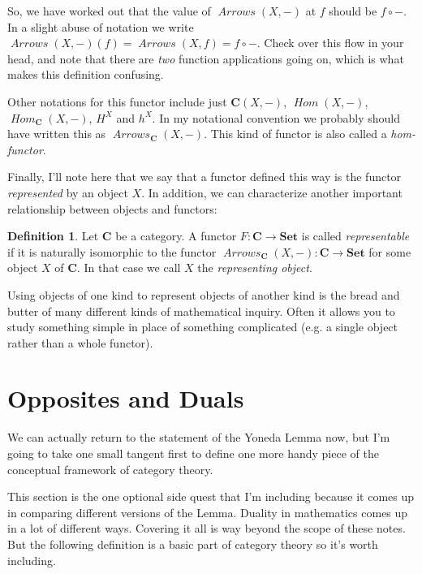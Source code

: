 \documentclass[12pt]{article}
\theoremstyle{definition}
\theoremstyle{definition}
\newtheorem{defn}{Definition}[]
\theoremstyle{definition}
\numberwithin{equation}{section}
\newcommand{\cat}[1]{\mathbf{#1}}      %
\newcommand{\fcat}[1]{{\mathbf {#1}}}    %
\newcommand{\CC}{\cat{C}}
\DeclareMathOperator{\Arrows}{\mathit{Arrows}}
\DeclareMathOperator{\Hom}{\mathit{Hom}}
\newcommand{\Set}{\fcat{Set}}           %
\def\ni{\goodbreak\noindent}
\begin{document}
So, we have worked out that the value of $\Arrows(X,-)$ at $f$ should be $f \circ -$.
In a slight abuse of notation we write
$\Arrows(X,-)(f) = \Arrows(X,f) = f \circ -$. 
Check over this flow in your head, and note that 
there are {\it two} function applications going on, which is what makes this definition 
confusing.

Other notations for this functor include just $\CC(X,-)$, $\Hom(X, -)$, $\Hom_\CC(X,
-)$, $H^X$ and $h^X$. In my notational convention we probably should have written this as
$\Arrows_{\CC}(X, -)$. This kind of functor is also called a {\it hom-functor}.

Finally, I'll note here that
we say that a functor defined this way is the functor {\it represented} by an object $X$.
In addition, we can characterize another important relationship between
objects and functors:

\begin{defn}
 Let $\cat{C}$ be a category. A functor $F:\cat{C}\to\Set$ is called \emph{representable}
 if it is naturally isomorphic to the functor $\Arrows_\cat{C}(X,-):\cat{C}\to\Set$ for some
 object $X$ of $\cat{C}$. In that case we call $X$ the \emph{representing object}. 
\end{defn}
\ni
Using objects of one kind to represent objects of another kind is the bread and butter of many
different kinds of mathematical inquiry. Often it allows  you to study something simple in place
of something complicated (e.g. a single object rather than a whole functor).

\section{Opposites and Duals}

We can actually return to the statement of the Yoneda Lemma now, but 
I'm going to take one small tangent first to define one more handy piece of
the conceptual framework of category theory.

This section is the one optional side quest that I'm including because it comes up in
comparing different versions of the Lemma. Duality in mathematics comes up in a lot of
different ways. Covering it all is way beyond the scope of these notes. But the following
definition is a basic part of category theory so it's worth including.
\end{document}
